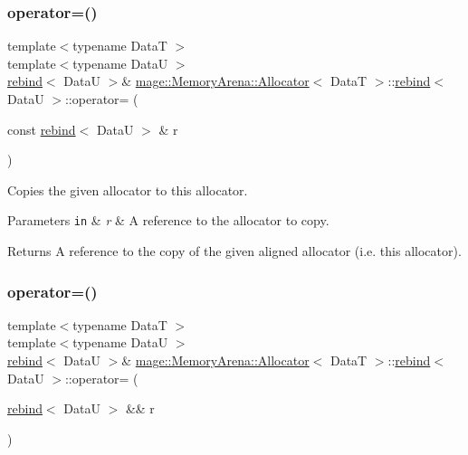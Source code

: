\subsubsection{\texorpdfstring{operator=()}{operator=()}\hspace{0.1cm}{\footnotesize\ttfamily [1/2]}}
{\footnotesize\ttfamily template$<$typename DataT $>$ \\
template$<$typename DataU $>$ \\
\hyperlink{structmage_1_1_memory_arena_1_1_allocator_1_1rebind}{rebind}$<$ DataU $>$\& \hyperlink{structmage_1_1_memory_arena_1_1_allocator}{mage\+::\+Memory\+Arena\+::\+Allocator}$<$ DataT $>$\+::\hyperlink{structmage_1_1_memory_arena_1_1_allocator_1_1rebind}{rebind}$<$ DataU $>$\+::operator= (\begin{DoxyParamCaption}\item[{const \hyperlink{structmage_1_1_memory_arena_1_1_allocator_1_1rebind}{rebind}$<$ DataU $>$ \&}]{r }\end{DoxyParamCaption})\hspace{0.3cm}{\ttfamily [delete]}}

Copies the given allocator to this allocator.


\begin{DoxyParams}[1]{Parameters}
\mbox{\tt in}  & {\em r} & A reference to the allocator to copy. \\
\hline
\end{DoxyParams}
\begin{DoxyReturn}{Returns}
A reference to the copy of the given aligned allocator (i.\+e. this allocator). 
\end{DoxyReturn}
\hypertarget{structmage_1_1_memory_arena_1_1_allocator_1_1rebind_aa8013303077d1d9a193730edf3239427}{}\label{structmage_1_1_memory_arena_1_1_allocator_1_1rebind_aa8013303077d1d9a193730edf3239427} 
\subsubsection{\texorpdfstring{operator=()}{operator=()}\hspace{0.1cm}{\footnotesize\ttfamily [2/2]}}
{\footnotesize\ttfamily template$<$typename DataT $>$ \\
template$<$typename DataU $>$ \\
\hyperlink{structmage_1_1_memory_arena_1_1_allocator_1_1rebind}{rebind}$<$ DataU $>$\& \hyperlink{structmage_1_1_memory_arena_1_1_allocator}{mage\+::\+Memory\+Arena\+::\+Allocator}$<$ DataT $>$\+::\hyperlink{structmage_1_1_memory_arena_1_1_allocator_1_1rebind}{rebind}$<$ DataU $>$\+::operator= (\begin{DoxyParamCaption}\item[{\hyperlink{structmage_1_1_memory_arena_1_1_allocator_1_1rebind}{rebind}$<$ DataU $>$ \&\&}]{r }\end{DoxyParamCaption})\hspace{0.3cm}{\ttfamily [delete]}}

